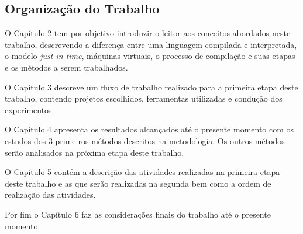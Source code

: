 \subsection*{Organização do Trabalho}

O Capítulo 2 tem por objetivo introduzir o leitor aos conceitos abordados
 neste trabalho, descrevendo a diferença entre uma linguagem compilada e
 interpretada, o modelo \textit{just-in-time}, máquinas virtuais, o processo de compilação
 e suas etapas e os métodos a serem trabalhados.

O Capítulo 3 descreve um fluxo de trabalho realizado para a primeira etapa
 deste trabalho, contendo projetos escolhidos, ferramentas utilizadas e
 condução dos experimentos.

O Capítulo 4 apresenta os resultados alcançados até o presente momento com
 os estudos dos 3 primeiros métodos descritos na metodologia. Os outros
 métodos serão analisados na próxima etapa deste trabalho.

O Capítulo 5 contém a descrição das atividades realizadas na primeira
 etapa deste trabalho e as que serão realizadas na segunda bem como a ordem
 de realização das atividades.

Por fim o Capítulo 6  faz as considerações finais do trabalho até o presente
 momento.
